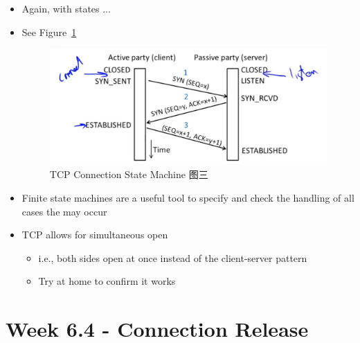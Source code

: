 \documentclass[12pt]{ctexart}   %
\begin{document}
\begin{itemize}
		 \item Again, with states ...
		  \item See Figure~\ref{fig:6-3-6}
		 
		 \begin{figure}[h!] %
		\centering
		 \includegraphics[scale=0.7]{images/6-3-6}
		\caption{ TCP Connection State Machine 图三 }
		 \label{fig:6-3-6}
		 \end{figure}
		 
		 \item Finite state machines are a useful tool to specify and check the handling of all cases the may occur
		 
		 \item TCP allows for simultaneous open
		 \begin{itemize}
		 	\item i.e., both sides open at once instead of the client-server pattern
		 	\item Try at home to confirm it works
		 \end{itemize}
		
	\end{itemize}
	
\section{ Week 6.4 - Connection Release }
\end{document}
